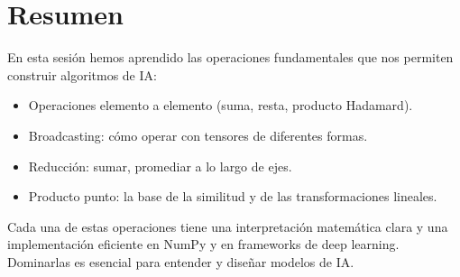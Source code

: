 \documentclass[12pt,a4paper,openany,oneside]{book}
\begin{document}
\section{Resumen}

En esta sesión hemos aprendido las operaciones fundamentales que nos permiten construir algoritmos de IA:
\begin{itemize}
    \item Operaciones elemento a elemento (suma, resta, producto Hadamard).
    \item Broadcasting: cómo operar con tensores de diferentes formas.
    \item Reducción: sumar, promediar a lo largo de ejes.
    \item Producto punto: la base de la similitud y de las transformaciones lineales.
\end{itemize}
Cada una de estas operaciones tiene una interpretación matemática clara y una implementación eficiente en NumPy y en frameworks de deep learning. Dominarlas es esencial para entender y diseñar modelos de IA.
\end{document}

